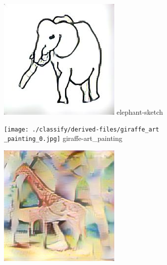 \documentclass{article}
\begin{document}
\begin{figure}[htp]
    \begin{minipage}{0.14285714285714285\linewidth}
        \includegraphics[width=\linewidth]{./classify/derived-files/elephant_sketch_0.jpg}
        {elephant-sketch}
    \end{minipage}%
    \begin{minipage}{0.14285714285714285\linewidth}
        \texttt{[image: ./classify/derived-files/giraffe\_art\\\_painting\_0.jpg]}
        {giraffe-art\_painting}
    \end{minipage}%
    \begin{minipage}{0.14285714285714285\linewidth}
        \includegraphics[width=\linewidth]{./classify/derived-files/giraffe_cartoon_0.jpg}

\end{minipage}
\end{figure}
\end{document}
